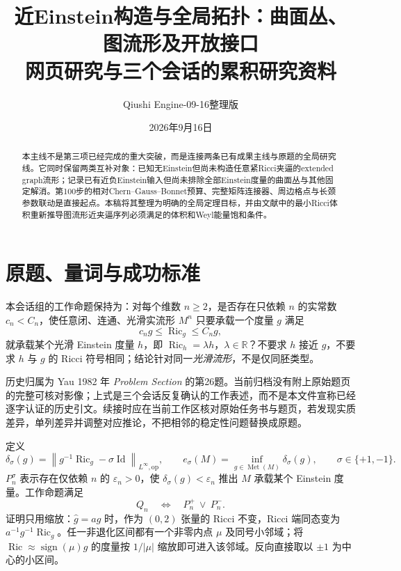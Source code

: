 \documentclass[UTF8,a4paper,11pt,fontset=fandol]{ctexart}
\title{近Einstein构造与全局拓扑：曲面丛、图流形及开放接口\\[0.5em]{\large 网页研究与三个会话的累积研究资料}}
\author{Qiushi Engine\quad 2026-09-16整理版}
\date{2026年9月16日}
\numberwithin{equation}{section}
\theoremstyle{definition}
\newcommand{\Ric}{\operatorname{Ric}}
\newcommand{\Met}{\operatorname{Met}}
\newcommand{\Id}{\operatorname{Id}}
\newcommand{\op}{\mathrm{op}}
\newcommand{\R}{\mathbb R}
\newcommand{\norm}[1]{\left\lVert#1\right\rVert}
\begin{document}
\maketitle
\begin{abstract}
本主线不是第三项已经完成的重大突破，而是连接两条已有成果主线与原题的全局研究线。它同时保留两类互补对象：已知无Einstein但尚未构造任意紧Ricci夹逼的extended graph流形；记录已有近负Einstein输入但尚未排除全部Einstein度量的曲面丛与其他固定解消。第100步的相对Chern--Gauss--Bonnet预算、完整矩阵连接器、周边格点与长颈参数联动是直接起点。本稿将其整理为明确的全局定理目标，并由文献中的最小Ricci体积重新推导图流形近夹逼序列必须满足的体积和Weyl能量饱和条件。
\end{abstract}
\begingroup
\small\linespread{1.0}\selectfont\setlength{\parskip}{0pt}
\tableofcontents
\endgroup
\clearpage

\section{原题、量词与成功标准}
本会话组的工作命题保持为：对每个维数 $n\ge2$，是否存在只依赖 $n$ 的实常数 $c_n<C_n$，使任意闭、连通、光滑实流形 $M^n$ 只要承载一个度量 $g$ 满足
\begin{equation}\label{eq:Q}
 c_ng\le\Ric_g\le C_ng,
\end{equation}
就承载某个光滑 Einstein 度量 $h$，即 $\Ric_h=\lambda h$，$\lambda\in\R$？不要求 $h$ 接近 $g$，不要求 $h$ 与 $g$ 的 Ricci 符号相同；结论针对同一\emph{光滑流形}，不是仅同胚类型。

历史归属为 Yau 1982 年 \emph{Problem Section} 的第26题\cite{Yau1982}。当前归档没有附上原始题页的完整可核对影像；上式是三个会话反复确认的工作表述，而不是本文件宣称已经逐字认证的历史引文。续接时应在当前工作区核对原始任务书与题页，若发现实质差异，单列差异并调整对应推论，不把相邻的稳定性问题替换成原题。

定义
\begin{equation}\label{eq:defect}
 \delta_\sigma(g)=\norm{g^{-1}\Ric_g-\sigma\Id}_{L^\infty,\op},\qquad
 e_\sigma(M)=\inf_{g\in\Met(M)}\delta_\sigma(g),\qquad \sigma\in\{+1,-1\}.
\end{equation}
$P_n^\sigma$ 表示存在仅依赖 $n$ 的 $\varepsilon_n>0$，使 $\delta_\sigma(g)<\varepsilon_n$ 推出 $M$ 承载某个 Einstein 度量。工作命题满足
\begin{equation}\label{eq:branches}
 Q_n\quad\Longleftrightarrow\quad P_n^+\ \lor\ P_n^-.
\end{equation}
证明只用缩放：$\widehat g=ag$ 时，作为 $(0,2)$ 张量的 Ricci 不变，Ricci 端同态变为 $a^{-1}g^{-1}\Ric_g$。任一非退化区间都有一个非零内点 $\mu$ 及同号小邻域；将 $\Ric\approx\operatorname{sign}(\mu)g$ 的度量按 $1/|\mu|$ 缩放即可进入该邻域。反向直接取以 $\pm1$ 为中心的小区间。
\end{document}
